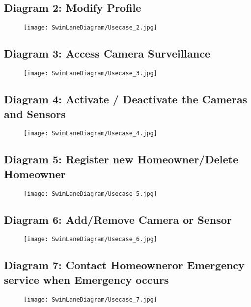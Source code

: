 \documentclass[twoside,11pt]{article}
\begin{document}
\subsection{Diagram 2: Modify Profile}

\begin{figure}[H]
    \centering
    \texttt{[image: SwimLaneDiagram/Usecase\_2.jpg]}
\end{figure}
\newpage

\subsection{Diagram 3: Access Camera Surveillance}

\begin{figure}[H]
    \centering
    \texttt{[image: SwimLaneDiagram/Usecase\_3.jpg]}
\end{figure}
\newpage

\subsection{Diagram 4: Activate / Deactivate the Cameras and Sensors}

\begin{figure}[H]
    \centering
    \texttt{[image: SwimLaneDiagram/Usecase\_4.jpg]}
\end{figure}
\newpage

\subsection{Diagram 5: Register new Homeowner/Delete Homeowner}
\begin{figure}[H]
    \centering
    \texttt{[image: SwimLaneDiagram/Usecase\_5.jpg]}
\end{figure}
\newpage

\subsection{Diagram 6: Add/Remove Camera or Sensor}
\begin{figure}[H]
    \centering
    \texttt{[image: SwimLaneDiagram/Usecase\_6.jpg]}
\end{figure}
\newpage

\subsection{Diagram 7: Contact Homeowneror Emergency service when Emergency occurs}
\begin{figure}[H]
    \centering
    \texttt{[image: SwimLaneDiagram/Usecase\_7.jpg]}
\end{figure}
\vskip 0.2in


\end{document}
